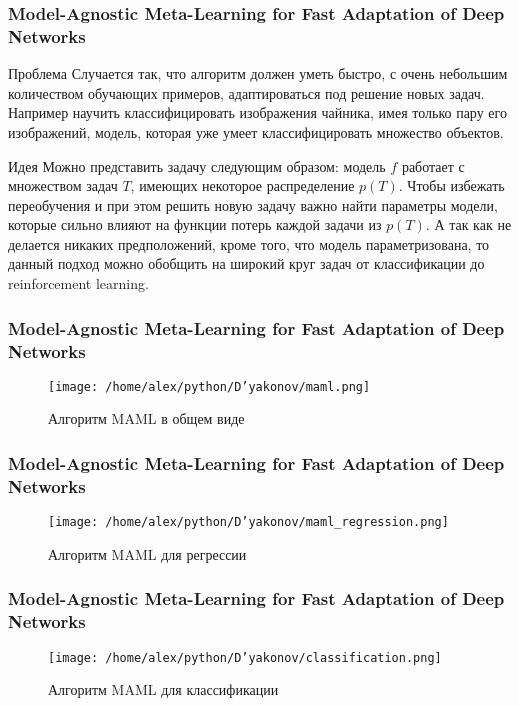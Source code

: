 \documentclass[fleqn, xcolor=x11names]{beamer}
\begin{document}
\begin{frame}\frametitle{Model-Agnostic Meta-Learning for Fast Adaptation of Deep Networks}

\begin{block}{Проблема}
{\footnotesize 
Случается так, что алгоритм должен уметь быстро, с очень небольшим количеством обучающих примеров, адаптироваться под решение новых задач. Например научить классифицировать изображения чайника, имея только пару его изображений, модель, которая уже умеет классифицировать множество объектов.
}
\end{block}

\begin{block}{Идея}
{\footnotesize 
Можно представить задачу следующим образом: модель $f$ работает с множеством задач $T$, имеющих некоторое распределение $p(T)$. Чтобы избежать переобучения и при этом решить новую задачу важно найти параметры модели, которые сильно влияют на функции потерь каждой задачи из $p(T)$. А так как не делается никаких предположений, кроме того, что модель параметризована, то данный подход можно обобщить на широкий круг задач от классификации до reinforcement learning. 
}
\end{block}

\end{frame}

\begin{frame}\frametitle{Model-Agnostic Meta-Learning for Fast Adaptation of Deep Networks}

\begin{figure}[h]
\begin{center}
\texttt{[image: /home/alex/python/D'yakonov/maml.png]}
\caption{ Алгоритм MAML в общем виде}
\end{center}
\end{figure}

\end{frame}

\begin{frame}\frametitle{Model-Agnostic Meta-Learning for Fast Adaptation of Deep Networks}

\begin{figure}[h]
\begin{center}
\texttt{[image: /home/alex/python/D'yakonov/maml\_regression.png]}
\caption{{\footnotesize  Алгоритм MAML для регрессии}}
\end{center}
\end{figure}

\end{frame}
\begin{frame}\frametitle{Model-Agnostic Meta-Learning for Fast Adaptation of Deep Networks}

\begin{figure}[h]
\begin{center}
\texttt{[image: /home/alex/python/D'yakonov/classification.png]}
\caption{ Алгоритм MAML для классификации}
\end{center}
\end{figure}

\end{frame}
\end{document}
